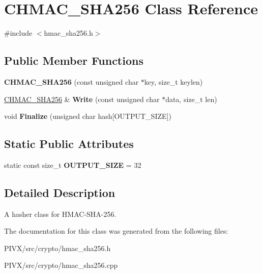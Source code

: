 \hypertarget{class_c_h_m_a_c___s_h_a256}{}\section{C\+H\+M\+A\+C\+\_\+\+S\+H\+A256 Class Reference}
\label{class_c_h_m_a_c___s_h_a256}


{\ttfamily \#include $<$hmac\+\_\+sha256.\+h$>$}

\subsection*{Public Member Functions}
\begin{DoxyCompactItemize}
\item 
\mbox{\label{class_c_h_m_a_c___s_h_a256_a63236821773ad9edb3fba4623eef39b2}} 
{\bfseries C\+H\+M\+A\+C\+\_\+\+S\+H\+A256} (const unsigned char $\ast$key, size\+\_\+t keylen)
\item 
\mbox{\label{class_c_h_m_a_c___s_h_a256_a24ac9cf00e60d8028ab79df4aed984ff}} 
\mbox{\hyperlink{class_c_h_m_a_c___s_h_a256}{C\+H\+M\+A\+C\+\_\+\+S\+H\+A256}} \& {\bfseries Write} (const unsigned char $\ast$data, size\+\_\+t len)
\item 
\mbox{\label{class_c_h_m_a_c___s_h_a256_a1cc600fd485b79dc52e11b12635c6dbe}} 
void {\bfseries Finalize} (unsigned char hash\mbox{[}O\+U\+T\+P\+U\+T\+\_\+\+S\+I\+ZE\mbox{]})
\end{DoxyCompactItemize}
\subsection*{Static Public Attributes}
\begin{DoxyCompactItemize}
\item 
\mbox{\label{class_c_h_m_a_c___s_h_a256_a6c94951e3698ec9bd4af95a1b9f9a2bb}} 
static const size\+\_\+t {\bfseries O\+U\+T\+P\+U\+T\+\_\+\+S\+I\+ZE} = 32
\end{DoxyCompactItemize}


\subsection{Detailed Description}
A hasher class for H\+M\+A\+C-\/\+S\+H\+A-\/256. 

The documentation for this class was generated from the following files\+:\begin{DoxyCompactItemize}
\item 
P\+I\+V\+X/src/crypto/hmac\+\_\+sha256.\+h\item 
P\+I\+V\+X/src/crypto/hmac\+\_\+sha256.\+cpp\end{DoxyCompactItemize}
